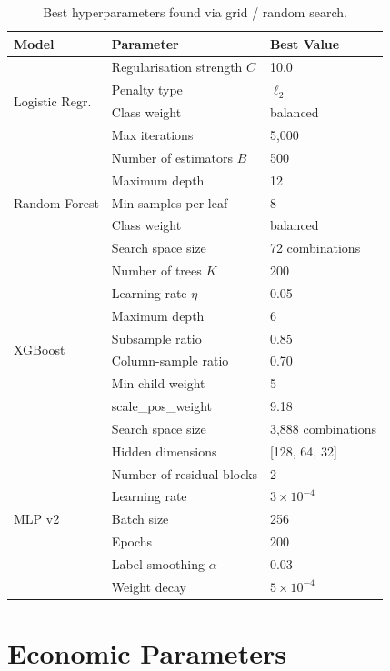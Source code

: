 \documentclass[11pt, a4paper]{article}
\begin{document}
\begin{table}[H]
\centering
\caption{Best hyperparameters found via grid / random search.}\label{tab:hparams}
\small
\renewcommand{\arraystretch}{1.05}
\begin{tabular}{@{}lll@{}}
\toprule
\textbf{Model} & \textbf{Parameter} & \textbf{Best Value}\\
\midrule
\multirow{4}{*}{Logistic Regr.}
 & Regularisation strength $C$ & 10.0\\
 & Penalty type & $\ell_2$\\
 & Class weight & balanced\\
 & Max iterations & 5{,}000\\
\midrule
\multirow{5}{*}{Random Forest}
 & Number of estimators $B$ & 500\\
 & Maximum depth & 12\\
 & Min samples per leaf & 8\\
 & Class weight & balanced\\
 & Search space size & 72 combinations\\
\midrule
\multirow{8}{*}{XGBoost}
 & Number of trees $K$ & 200\\
 & Learning rate $\eta$ & 0.05\\
 & Maximum depth & 6\\
 & Subsample ratio & 0.85\\
 & Column-sample ratio & 0.70\\
 & Min child weight & 5\\
 & scale\_pos\_weight & 9.18\\
 & Search space size & 3{,}888 combinations\\
\midrule
\multirow{7}{*}{MLP v2}
 & Hidden dimensions & [128, 64, 32]\\
 & Number of residual blocks & 2\\
 & Learning rate & $3\times10^{-4}$\\
 & Batch size & 256\\
 & Epochs & 200\\
 & Label smoothing $\alpha$ & 0.03\\
 & Weight decay & $5\times10^{-4}$\\
\bottomrule
\end{tabular}
\end{table}

\section{Economic Parameters}\label{app:econ_params}
\end{document}
